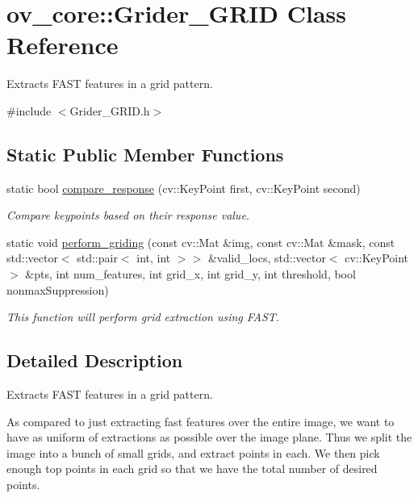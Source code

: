 \hypertarget{classov__core_1_1Grider__GRID}{}\section{ov\+\_\+core\+:\+:Grider\+\_\+\+G\+R\+ID Class Reference}
\label{classov__core_1_1Grider__GRID}


Extracts F\+A\+ST features in a grid pattern.  




{\ttfamily \#include $<$Grider\+\_\+\+G\+R\+I\+D.\+h$>$}

\subsection*{Static Public Member Functions}
\begin{DoxyCompactItemize}
\item 
static bool \hyperlink{classov__core_1_1Grider__GRID_a6e78e323f7c99e2a13be240345c564f3}{compare\+\_\+response} (cv\+::\+Key\+Point first, cv\+::\+Key\+Point second)
\begin{DoxyCompactList}\small\item\em Compare keypoints based on their response value. \end{DoxyCompactList}\item 
static void \hyperlink{classov__core_1_1Grider__GRID_a5021984f1ab36317c43ea3beddfd34e2}{perform\+\_\+griding} (const cv\+::\+Mat \&img, const cv\+::\+Mat \&mask, const std\+::vector$<$ std\+::pair$<$ int, int $>$$>$ \&valid\+\_\+locs, std\+::vector$<$ cv\+::\+Key\+Point $>$ \&pts, int num\+\_\+features, int grid\+\_\+x, int grid\+\_\+y, int threshold, bool nonmax\+Suppression)
\begin{DoxyCompactList}\small\item\em This function will perform grid extraction using F\+A\+ST. \end{DoxyCompactList}\end{DoxyCompactItemize}


\subsection{Detailed Description}
Extracts F\+A\+ST features in a grid pattern. 

As compared to just extracting fast features over the entire image, we want to have as uniform of extractions as possible over the image plane. Thus we split the image into a bunch of small grids, and extract points in each. We then pick enough top points in each grid so that we have the total number of desired points. 

